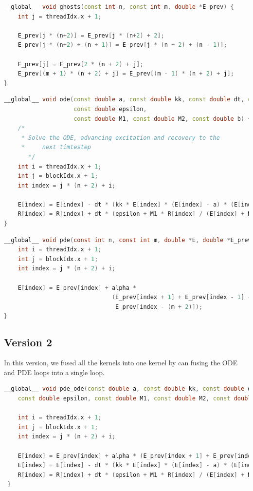\documentclass{article}
\newcommand\tab[1][0.5cm]{\hspace*{#1}}
\begin{document}
\begin{lstlisting}[language=C++]
__global__ void ghosts(const int n, const int m, double *E_prev) {
    int j = threadIdx.x + 1;

    E_prev[j * (n+2)] = E_prev[j * (n+2) + 2];
    E_prev[j * (n+2) + (n + 1)] = E_prev[j * (n + 2) + (n - 1)];

    E_prev[j] = E_prev[2 * (n + 2) + j];
    E_prev[(m + 1) * (n + 2) + j] = E_prev[(m - 1) * (n + 2) + j];
}
\end{lstlisting}

\begin{lstlisting}[language=C++]
__global__ void ode(const double a, const double kk, const double dt, const int n, const int m, double *E, double *R,
                    const double epsilon,
                    const double M1, const double M2, const double b) {
    /*
     * Solve the ODE, advancing excitation and recovery to the
     *     next timtestep
       */
    int i = threadIdx.x + 1;
    int j = blockIdx.x + 1;
    int index = j * (n + 2) + i;

    E[index] = E[index] - dt * (kk * E[index] * (E[index] - a) * (E[index] - 1) + E[index] * R[index]);
    R[index] = R[index] + dt * (epsilon + M1 * R[index] / (E[index] + M2)) * (-R[index] - kk * E[index] * (E[index] - b - 1));
}
\end{lstlisting}

\begin{lstlisting}[language=C]
__global__ void pde(const int n, const int m, double *E, double *E_prev, const double alpha) {
	int i = threadIdx.x + 1;
	int j = blockIdx.x + 1;
	int index = j * (n + 2) + i;
	
    E[index] = E_prev[index] + alpha *
                               (E_prev[index + 1] + E_prev[index - 1] - 4 * E_prev[index] + E_prev[index + m + 2] +
                                E_prev[index - (m + 2)]);
}
\end{lstlisting}


\subsection{Version 2}
\tab In this version, we fused all the kernels into one kernel by can fusing the ODE and PDE loops into a single loop.

\begin{lstlisting}[language=C++]
__global__ void pde_ode(const double a, const double kk, const double dt, const int n, const int m, double *E, double *E_prev, double *R, 
    const double epsilon, const double M1, const double M2, const double b, const double alpha) {
    
    int i = threadIdx.x + 1;
    int j = blockIdx.x + 1;
    int index = j * (n + 2) + i;
     
    E[index] = E_prev[index] + alpha * (E_prev[index + 1] + E_prev[index - 1] - 4 * E_prev[index] + E_prev[index + m + 2] + E_prev[index - (m + 2)]);
    E[index] = E[index] - dt * (kk * E[index] * (E[index] - a) * (E[index] - 1) + E[index] * R[index]);
    R[index] = R[index] + dt * (epsilon + M1 * R[index] / (E[index] + M2)) * (-R[index] - kk * E[index] * (E[index] - b - 1));
 }
\end{lstlisting}
\end{document}
